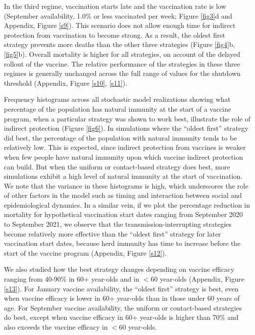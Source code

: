 In the third regime, vaccination starts late and the vaccination rate is low (September availability, 1.0\% or less vaccinated per week; Figure \ref{fig3}d and Appendix, Figure \ref{s9}). This scenario does not allow enough time for indirect protection from vaccination to become strong.  As a result, the oldest first strategy prevents more deaths than the other three strategies (Figure \ref{fig4}b, \ref{fig5}b).  Overall mortality is higher for all strategies, on account of the delayed rollout of the vaccine.  The relative performance of the strategies in these three regimes is generally unchanged across the full range of values for the shutdown threshold (Appendix, Figure \ref{s10}, \ref{s11}).  

Frequency histograms across all stochastic model realizations showing what percentage of the population has natural immunity at the start of a vaccine program, when a particular strategy was shown to work best, illustrate the role of indirect protection (Figure \ref{fig6}). In simulations where the “oldest first” strategy did best, the percentage of the population with natural immunity tends to be relatively low. This is expected, since indirect protection from vaccines is weaker when few people have natural immunity upon which vaccine indirect protection can build.  But when the uniform or contact-based strategy does best, more simulations exhibit a high level of natural immunity at the start of vaccination.  We note that the variance in these histograms is high, which underscores the role of other factors in the model such as timing and interaction between social and epidemiological dynamics. In a similar vein, if we plot the percentage reduction in mortality for hypothetical vaccination start dates ranging from September 2020 to September 2021, we observe that the transmission-interrupting strategies become relatively more effective than the “oldest first” strategy for later vaccination start dates, because herd immunity has time to increase before the start of the vaccine program (Appendix, Figure \ref{s12}). 

We also studied how the best strategy changes depending on vaccine efficacy ranging from 40-90\% in 60+ year-olds and in $<60$ year-olds (Appendix, Figure \ref{s13}).  For January vaccine availability, the “oldest first” strategy is best, even when vaccine efficacy is lower in 60+ year-olds than in those under 60 years of age.  For September vaccine availability, the uniform or contact-based strategies do best, except when vaccine efficacy in 60+ year-olds is higher than 70\% and also exceeds the vaccine efficacy in $<60$ year-olds. 

